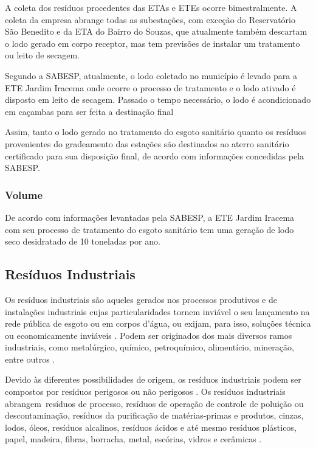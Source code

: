 	A coleta dos resíduos procedentes das ETAs e ETEs ocorre bimestralmente. A coleta da empresa abrange todas as subestações, com exceção do Reservatório São Benedito e da ETA do Bairro do Souzas, que atualmente também descartam o lodo gerado em corpo receptor, mas tem previsões de instalar um tratamento ou leito de secagem.
	
	Segundo a SABESP, atualmente, o lodo coletado no município é levado para a ETE Jardim Iracema onde ocorre o processo de tratamento e o lodo ativado é disposto em leito de secagem. Passado o tempo necessário, o lodo é acondicionado em caçambas para ser feita a destinação final
	
	Assim, tanto o lodo gerado no tratamento do esgoto sanitário quanto os resíduos provenientes do gradeamento das estações são destinados ao aterro sanitário certificado para sua disposição final, de acordo com informações concedidas pela SABESP. 
	
	\subsubsection{Volume}
	De acordo com informações levantadas pela SABESP, a ETE Jardim Iracema com seu processo de tratamento do esgoto sanitário tem uma geração de lodo seco desidratado de 10 toneladas por ano.
	
	\subsection{Resíduos Industriais}
	
	Os resíduos industriais são aqueles gerados nos processos produtivos e de instalações industriais cujas particularidades tornem inviável o seu lançamento na rede pública de esgoto ou em corpos d’água, ou exijam, para isso, soluções técnica ou economicamente inviáveis \cite{brasil:12305, conama:313}. Podem ser originados dos mais diversos ramos industriais, como metalúrgico, químico, petroquímico, alimentício, mineração, entre outros \cite{IPEA2012b}.
	
	Devido às diferentes possibilidades de origem, os resíduos industriais podem ser compostos por resíduos perigosos ou não perigosos \cite{conama:313}. Os resíduos industriais abrangem resíduos de processo, resíduos de operação de controle de poluição ou descontaminação, resíduos da purificação de matérias-primas e produtos, cinzas, lodos, óleos, resíduos alcalinos, resíduos ácidos e até mesmo resíduos plásticos, papel, madeira, fibras, borracha, metal, escórias, vidros e cerâmicas \cite{IPEA2012b}.
	
